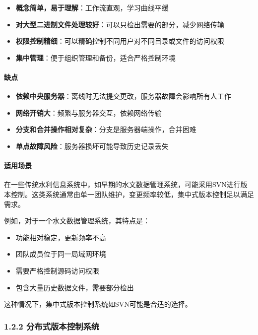\begin{itemize}
\tightlist
\item
  \textbf{概念简单，易于理解}：工作流直观，学习曲线平缓
\item
  \textbf{对大型二进制文件处理较好}：可以只检出需要的部分，减少网络传输
\item
  \textbf{权限控制精细}：可以精确控制不同用户对不同目录或文件的访问权限
\item
  \textbf{集中管理}：便于组织管理和备份，适合严格控制环境
\end{itemize}

\paragraph{缺点}\label{ux7f3aux70b9}

\begin{itemize}
\tightlist
\item
  \textbf{依赖中央服务器}：离线时无法提交更改，服务器故障会影响所有人工作
\item
  \textbf{网络开销大}：频繁与服务器交互，依赖网络传输
\item
  \textbf{分支和合并操作相对复杂}：分支是服务器端操作，合并困难
\item
  \textbf{单点故障风险}：服务器损坏可能导致历史记录丢失
\end{itemize}

\paragraph{适用场景}\label{ux9002ux7528ux573aux666f}

在一些传统水利信息系统中，如早期的水文数据管理系统，可能采用SVN进行版本控制。这类系统通常由单一团队维护，变更频率较低，集中式版本控制足以满足需求。

例如，对于一个水文数据管理系统，其特点是：

\begin{itemize}
\tightlist
\item
  功能相对稳定，更新频率不高
\item
  团队成员位于同一局域网环境
\item
  需要严格控制源码访问权限
\item
  包含大量历史数据文件，需要部分检出
\end{itemize}

这种情况下，集中式版本控制系统如SVN可能是合适的选择。

\subsubsection{1.2.2
分布式版本控制系统}\label{ux5206ux5e03ux5f0fux7248ux672cux63a7ux5236ux7cfbux7edf}

